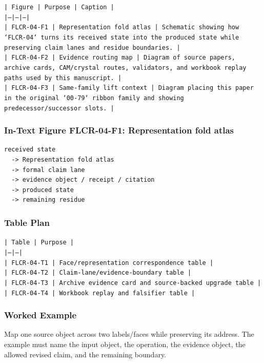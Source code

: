 \documentclass[11pt]{article}
\begin{document}
\noindent\texttt{| Figure | Purpose | Caption |}\\
\noindent\texttt{|---|---|---|}\\
\noindent\texttt{| FLCR-04-F1 | Representation fold atlas | Schematic showing how `FLCR-04` turns its received state into the produced state while preserving claim lanes and residue boundaries. |}\\
\noindent\texttt{| FLCR-04-F2 | Evidence routing map | Diagram of source papers, archive cards, CAM/crystal routes, validators, and workbook replay paths used by this manuscript. |}\\
\noindent\texttt{| FLCR-04-F3 | Same-family lift context | Diagram placing this paper in the original `00-79` ribbon family and showing predecessor/successor slots. |}\\

\subsubsection*{In-Text Figure FLCR-04-F1: Representation fold atlas}

\begin{verbatim}
received state
  -> Representation fold atlas
  -> formal claim lane
  -> evidence object / receipt / citation
  -> produced state
  -> remaining residue
\end{verbatim}

\subsubsection*{Table Plan}

\noindent\texttt{| Table | Purpose |}\\
\noindent\texttt{|---|---|}\\
\noindent\texttt{| FLCR-04-T1 | Face/representation correspondence table |}\\
\noindent\texttt{| FLCR-04-T2 | Claim-lane/evidence-boundary table |}\\
\noindent\texttt{| FLCR-04-T3 | Archive evidence card and source-backed upgrade table |}\\
\noindent\texttt{| FLCR-04-T4 | Workbook replay and falsifier table |}\\

\subsubsection*{Worked Example}

Map one source object across two labels/faces while preserving its address. The example must name the input object, the operation,
the evidence object, the allowed revised claim, and the remaining boundary.
\end{document}
